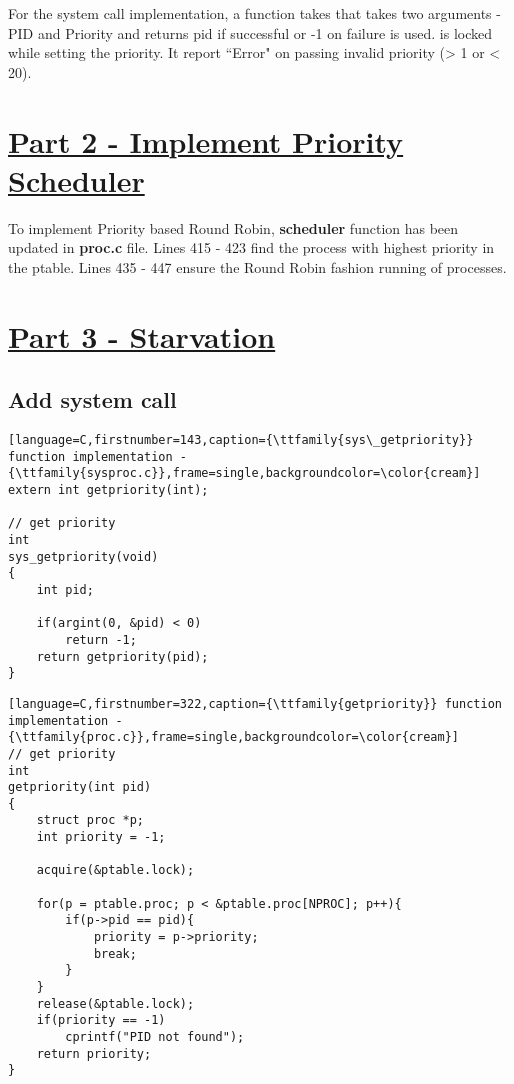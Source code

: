 \documentclass[12pt]{article}
\begin{document}
\vspace{5mm}
\begin{addmargin}[0.3in]{0in}
    For the {} system call implementation, a function takes that takes two arguments - PID and Priority and returns pid if successful or -1 on failure is used. {} is locked while setting the priority. It report ``Error" on passing invalid priority (\textgreater{} 1 or \textless{} 20).
\end{addmargin}

\section*{\underline{Part 2 - Implement Priority Scheduler}}
\begin{addmargin}[0.3in]{0in}
To implement Priority based Round Robin, \textbf{scheduler} function has been updated in \textbf{proc.c} file. Lines 415 - 423 find the process with highest priority in the ptable. Lines 435 - 447  ensure the Round Robin fashion running of processes.
\end{addmargin}

\section*{\underline{Part 3 - Starvation}}
\subsection*{Add {} system call}
\begin{addmargin}[0.3in]{0in}
\begin{lstlisting}[language=C,firstnumber=143,caption={\ttfamily{sys\_getpriority}} function implementation - {\ttfamily{sysproc.c}},frame=single,backgroundcolor=\color{cream}]
extern int getpriority(int);

// get priority
int
sys_getpriority(void)
{
    int pid;

    if(argint(0, &pid) < 0)
        return -1;
    return getpriority(pid);
}
\end{lstlisting}
\begin{lstlisting}[language=C,firstnumber=322,caption={\ttfamily{getpriority}} function implementation - {\ttfamily{proc.c}},frame=single,backgroundcolor=\color{cream}]
// get priority
int
getpriority(int pid)
{
    struct proc *p;
    int priority = -1;
    
    acquire(&ptable.lock);

    for(p = ptable.proc; p < &ptable.proc[NPROC]; p++){
        if(p->pid == pid){
            priority = p->priority;
            break;
        }
    }
    release(&ptable.lock);
    if(priority == -1)
        cprintf("PID not found");
    return priority;
}
\end{lstlisting}
\end{addmargin}
\end{document}
